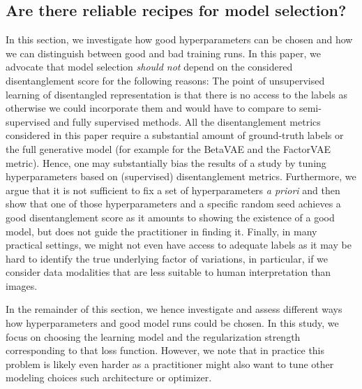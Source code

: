\subsection{Are there reliable recipes for model selection?}\label{app:hyper_selection}
In this section, we investigate how good hyperparameters can be chosen and how we can distinguish between good and bad training runs. 
In this paper, we advocate that model selection \emph{should not} depend on the considered disentanglement score for the following reasons:
The point of unsupervised learning of disentangled representation is that there is no access to the labels as otherwise we could incorporate them and would have to compare to semi-supervised and fully supervised methods.
All the disentanglement metrics considered in this paper require a substantial amount of ground-truth labels or the full generative model (for example for the BetaVAE and the FactorVAE metric).
Hence, one may substantially bias the results of a study by tuning hyperparameters based on (supervised) disentanglement metrics. 
Furthermore, we argue that it is not sufficient to fix a set of hyperparameters \emph{a priori} and then show that one of those hyperparameters and a specific random seed achieves a good disentanglement score as it amounts to showing the existence of a good model, but does not guide the practitioner in finding it.
Finally, in many practical settings, we might not even have access to adequate labels as it may be hard to identify the true underlying factor of variations, in particular, if we consider data modalities that are less suitable to human interpretation than images.

In the remainder of this section, we hence investigate and assess different ways how hyperparameters and good model runs could be chosen.
In this study, we focus on choosing the learning model and the regularization strength corresponding to that loss function.
However, we note that in practice this problem is likely even harder as a practitioner might also want to tune other modeling choices such architecture or optimizer.
 
